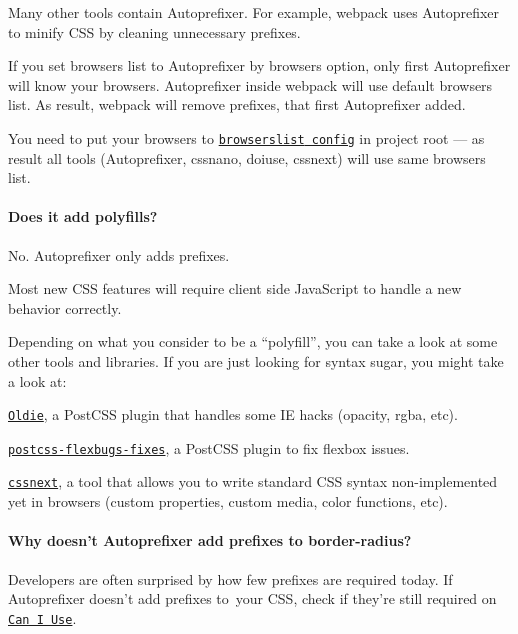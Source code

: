 Many other tools contain Autoprefixer. For example, webpack uses Autoprefixer to minify C\+SS by cleaning unnecessary prefixes.

If you set browsers list to Autoprefixer by {\ttfamily browsers} option, only first Autoprefixer will know your browsers. Autoprefixer inside webpack will use default browsers list. As result, webpack will remove prefixes, that first Autoprefixer added.

You need to put your browsers to \href{https://github.com/ai/browserslist#config-file}{\tt {\ttfamily browserslist} config} in project root — as result all tools (Autoprefixer, cssnano, doiuse, cssnext) will use same browsers list.

\paragraph*{Does it add polyfills?}

No. Autoprefixer only adds prefixes.

Most new C\+SS features will require client side Java\+Script to handle a new behavior correctly.

Depending on what you consider to be a “polyfill”, you can take a look at some other tools and libraries. If you are just looking for syntax sugar, you might take a look at\+:


\begin{DoxyItemize}
\item \href{https://github.com/jonathantneal/oldie}{\tt Oldie}, a Post\+C\+SS plugin that handles some IE hacks (opacity, rgba, etc).
\item \href{https://github.com/luisrudge/postcss-flexbugs-fixes}{\tt postcss-\/flexbugs-\/fixes}, a Post\+C\+SS plugin to fix flexbox issues.
\item \href{https://github.com/MoOx/postcss-cssnext}{\tt cssnext}, a tool that allows you to write standard C\+SS syntax non-\/implemented yet in browsers (custom properties, custom media, color functions, etc).
\end{DoxyItemize}

\paragraph*{Why doesn’t Autoprefixer add prefixes to {\ttfamily border-\/radius}?}

Developers are often surprised by how few prefixes are required today. If Autoprefixer doesn’t add prefixes to your C\+SS, check if they’re still required on \href{http://caniuse.com/}{\tt Can I Use}.

